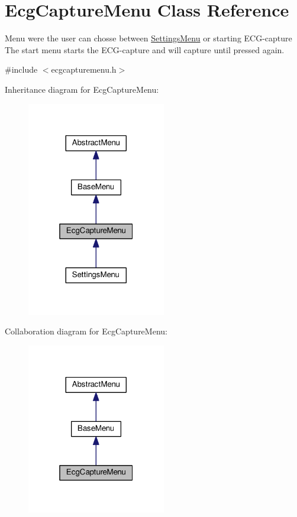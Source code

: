 \hypertarget{classEcgCaptureMenu}{}\section{Ecg\+Capture\+Menu Class Reference}
\label{classEcgCaptureMenu}


Menu were the user can chosse between \hyperlink{classSettingsMenu}{Settings\+Menu} or starting E\+C\+G-\/capture The start menu starts the E\+C\+G-\/capture and will capture until pressed again.  




{\ttfamily \#include $<$ecgcapturemenu.\+h$>$}



Inheritance diagram for Ecg\+Capture\+Menu\+:
\nopagebreak
\begin{figure}[H]
\begin{center}
\leavevmode
\includegraphics[width=172pt]{classEcgCaptureMenu__inherit__graph}
\end{center}
\end{figure}


Collaboration diagram for Ecg\+Capture\+Menu\+:
\nopagebreak
\begin{figure}[H]
\begin{center}
\leavevmode
\includegraphics[width=172pt]{classEcgCaptureMenu__coll__graph}
\end{center}
\end{figure}
